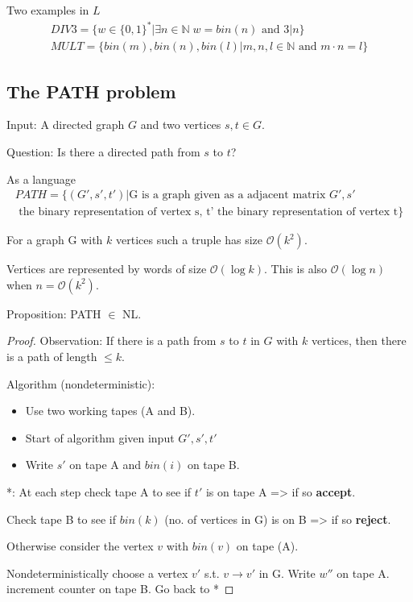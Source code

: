 \documentclass[a4paper,12pt]{article}
\theoremstyle{definition}
\theoremstyle{remark}
\newcommand{\N}{\mathbb{N}}
\begin{document}
Two examples in $L$
\begin{gather*}
    DIV3 = \{w \in \{0, 1\}^* | \exists n \in \N \; w = bin(n) \text{ and } 3|n\} \\
    MULT = \{bin(m), bin(n), bin(l) | m, n, l \in \N \text{ and } m \cdot n = l\}
\end{gather*}

\subsection{The PATH problem}
Input: A directed graph $G$ and two vertices $s, t \in G$.

Question: Is there a directed path from $s$ to $t$?

As a language
\begin{gather*}
    PATH = \{(G', s', t') | \text{G is a graph given as a adjacent matrix } G', s' \\
    \text{ the binary representation of vertex s, t' the binary representation of vertex t}\}
\end{gather*}

For a graph G with $k$ vertices such a truple has size $\mathscr{O}(k^2)$.

Vertices are represented by words of size $\mathscr{O}(\log k)$. This is also $\mathscr{O}(\log n)$ when $n = \mathscr{O}(k^2)$.

Proposition: PATH $\in$ NL.

\begin{proof}
    Observation: If there is a path from $s$ to $t$ in $G$ with $k$ vertices, then there is a path of length $ \leq k$.

    Algorithm (nondeterministic):
    \begin{itemize}
        \item Use two working tapes (A and B).
        \item Start of algorithm given input $G', s', t'$ 
        \item Write $s'$ on tape A and $bin(i)$ on tape B.
    \end{itemize}

    *: At each step check tape A to see if $t'$ is on tape A => if so \textbf{accept}.

    Check tape B to see if $bin(k)$ (no. of vertices in G) is on B => if so \textbf{reject}.

    Otherwise consider the vertex $v$ with $bin(v)$ on tape (A).

    Nondeterministically choose a vertex $v'$ s.t. $v \to v'$ in G. Write $w''$ on tape A. increment counter on tape B. Go back to *
\end{proof}
\end{document}
